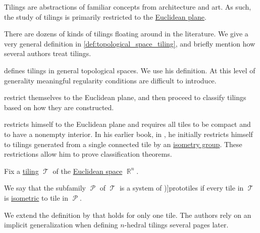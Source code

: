 \begin{remark}\label{rem:tiling_definition}
  Tilings are abstractions of familiar concepts from architecture and art. As such, the study of tilings is primarily restricted to the \hyperref[def:euclidean_plane]{Euclidean plane}.

  There are dozens of kinds of tilings floating around in the literature. We give a very general definition in \cref{def:topological_space_tiling}, and briefly mention how several authors treat tilings.

  \begin{thmenum}
      defines tilings in general topological spaces. We use his definition. At this level of generality meaningful regularity conditions are difficult to introduce.

      restrict themselves to the Euclidean plane, and then proceed to classify tilings based on how they are constructed.

      restricts himself to the Euclidean plane and requires all tiles to be compact and to have a nonempty interior. In his earlier book, in \cite[\S 1.7.3]{Berger1987GeometryI}, he initially restricts himself to tilings generated from a single connected tile by an \hyperref[def:isometry_group]{isometry group}. These restrictions allow him to prove classification theorems.
  \end{thmenum}
\end{remark}

\begin{definition}\label{def:prototile}\mimprovised
  Fix a \hyperref[def:topological_space_tiling]{tiling} \( \mscrT \) of the \hyperref[def:euclidean_space]{Euclidean space} \( \BbbR^n \).

  We say that the subfamily \( \mscrP \) of \( \mscrT \) is a system of \term[en=prototile (\cite[20]{GrünbaumShephard1987TilingsAndPatterns})]{prototiles} if every tile in \( \mscrT \) is \hyperref[def:isometry]{isometric} to  tile in \( \mscrP \).
\end{definition}
\begin{comments}
  \item We extend the definition by  that holds for only one tile. The authors rely on an implicit generalization when defining \( n \)-hedral tilings several pages later.
\end{comments}

